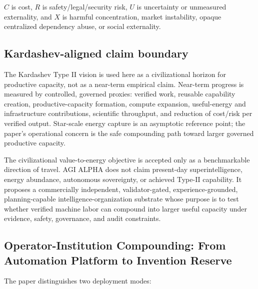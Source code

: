 \(C\) is cost, \(R\) is safety/legal/security risk, \(U\) is uncertainty
or unmeasured externality, and \(X\) is harmful concentration, market
instability, opaque centralized dependency abuse, or social externality.

\subsection{Kardashev-aligned claim
boundary}\label{kardashev-aligned-claim-boundary}

The Kardashev Type II vision is used here as a civilizational horizon
for productive capacity, not as a near-term empirical claim. Near-term
progress is measured by controlled, governed proxies: verified work,
reusable capability creation, productive-capacity formation, compute
expansion, useful-energy and infrastructure contributions, scientific
throughput, and reduction of cost/risk per verified output. Star-scale
energy capture is an asymptotic reference point; the paper's operational
concern is the safe compounding path toward larger governed productive
capacity.

The civilizational value-to-energy objective is accepted only as a
benchmarkable direction of travel. AGI ALPHA does not claim present-day
superintelligence, energy abundance, autonomous sovereignty, or achieved
Type-II capability. It proposes a commercially independent,
validator-gated, experience-grounded, planning-capable
intelligence-organization substrate whose purpose is to test whether
verified machine labor can compound into larger useful capacity under
evidence, safety, governance, and audit constraints.

\subsection{Operator-Institution Compounding: From Automation Platform
to Invention
Reserve}\label{operator-institution-compounding-from-automation-platform-to-invention-reserve}

The paper distinguishes two deployment modes:

